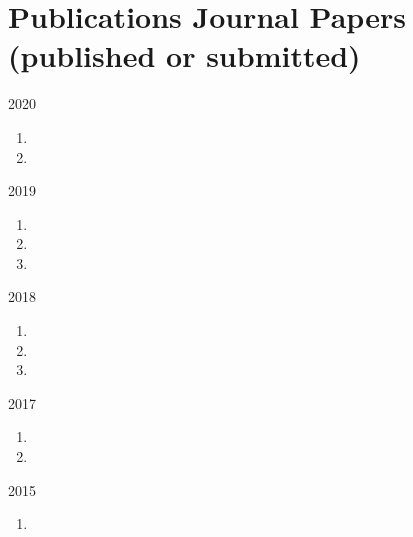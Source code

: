 \section*{Publications {\small Journal Papers (published or submitted)}}

\begin{paracol}{2}
  \textsc{2020}
\switchcolumn
  \begin{enumerate}
    \item {}
    \item {}
    \setcounter{pubcounter}{\theenumi}
  \end{enumerate}
\end{paracol}

\begin{paracol}{2}
  \textsc{2019}
\switchcolumn
  \begin{enumerate}
    \setcounter{enumi}{\thepubcounter}
    \item {}
    \item {}
    \item {}
    \setcounter{pubcounter}{\theenumi}
  \end{enumerate}
\end{paracol}

\begin{paracol}{2}
  \textsc{2018}
\switchcolumn
  \begin{enumerate}
    \setcounter{enumi}{\thepubcounter}
    \item {}
    \item {}
    \item {}
    \setcounter{pubcounter}{\theenumi}
  \end{enumerate}
\end{paracol}

\begin{paracol}{2}
  \textsc{2017}
\switchcolumn
  \begin{enumerate}
    \setcounter{enumi}{\thepubcounter}
    \item {}
    \item {}
    \setcounter{pubcounter}{\theenumi}
  \end{enumerate}
\end{paracol}

\begin{paracol}{2}
  \textsc{2015}
\switchcolumn
  \begin{enumerate}
    \setcounter{enumi}{\thepubcounter}
    \item {}
    \setcounter{pubcounter}{\theenumi}
  \end{enumerate}
\end{paracol}